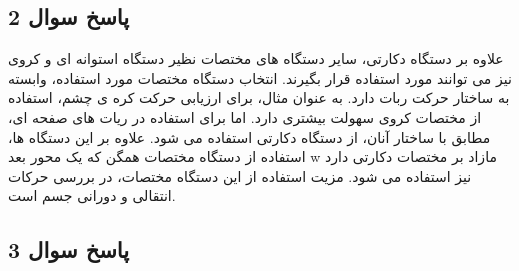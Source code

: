 \subsection{ پاسخ سوال 2}

علاوه بر دستگاه دکارتی، سایر دستگاه های مختصات نظیر دستگاه استوانه ای و کروی نیز می توانند مورد استفاده قرار بگیرند. انتخاب دستگاه مختصات مورد استفاده، وابسته به ساختار حرکت ربات دارد. به عنوان مثال، برای ارزیابی حرکت کره ی چشم، استفاده از مختصات کروی سهولت بیشتری دارد. اما برای استفاده در ریات های صفحه ای، مطابق با ساختار آنان، از دستگاه دکارتی استفاده می شود.
علاوه بر این دستگاه ها، استفاده از دستگاه مختصات همگن که یک محور بعد w مازاد بر مختصات دکارتی دارد نیز استفاده می شود. مزیت استفاده از این دستگاه مختصات، در بررسی حرکات انتقالی و دورانی جسم است.



\subsection{ پاسخ سوال 3}


